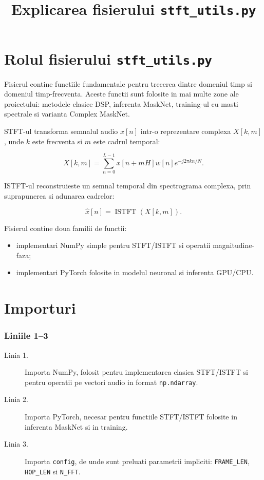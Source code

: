 \documentclass[12pt,a4paper]{report}
\title{Explicarea fisierului \texttt{stft\_utils.py}}
\author{}
\date{}
\newcommand{\codechunk}[2]{%
\subsection*{Liniile #1--#2}

}
\begin{document}
\maketitle
\tableofcontents
\clearpage

\chapter{Rolul fisierului \texttt{stft\_utils.py}}

Fisierul  contine functiile fundamentale pentru
trecerea dintre domeniul timp si domeniul timp-frecventa. Aceste functii sunt
folosite in mai multe zone ale proiectului: metodele clasice DSP, inferenta
MaskNet, training-ul cu masti spectrale si varianta Complex MaskNet.

STFT-ul transforma semnalul audio \(x[n]\) intr-o reprezentare complexa
\(X[k,m]\), unde \(k\) este frecventa si \(m\) este cadrul temporal:

\[
X[k,m] =
\sum_{n=0}^{L-1} x[n+mH]w[n]e^{-j2\pi kn/N}.
\]

ISTFT-ul reconstruieste un semnal temporal din spectrograma complexa, prin
suprapunerea si adunarea cadrelor:

\[
\hat{x}[n] = \operatorname{ISTFT}(X[k,m]).
\]

Fisierul contine doua familii de functii:

\begin{itemize}
    \item implementari NumPy simple pentru STFT/ISTFT si operatii magnitudine-faza;
    \item implementari PyTorch folosite in modelul neuronal si inferenta GPU/CPU.
\end{itemize}

\chapter{Importuri}

\codechunk{1}{3}

\begin{description}
    \item[Linia 1.] Importa NumPy, folosit pentru implementarea clasica STFT/ISTFT
    si pentru operatii pe vectori audio in format \texttt{np.ndarray}.

    \item[Linia 2.] Importa PyTorch, necesar pentru functiile STFT/ISTFT folosite
    in inferenta MaskNet si in training.

    \item[Linia 3.] Importa \texttt{config}, de unde sunt preluati parametrii
    impliciti: \texttt{FRAME\_LEN}, \texttt{HOP\_LEN} si \texttt{N\_FFT}.
\end{description}
\end{document}
